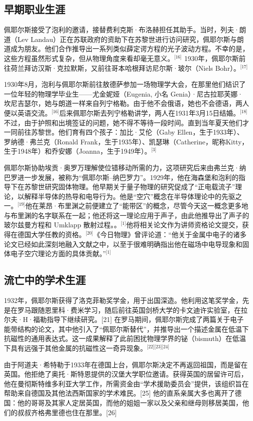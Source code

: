 \subsection{早期职业生涯}
佩耶尔斯接受了泡利的邀请，接替费利克斯·布洛赫担任其助手。当时，列夫·朗道（Lev Landau）正在苏联政府的资助下在苏黎世进行访问研究，佩耶尔斯与朗道成为朋友。他们合作推导出一系列类似薛定谔方程的光子波动方程。不幸的是，这些方程虽然形式复杂，但从物理角度来看却毫无意义。\(^\text{[16]}\)
1930年，佩耶尔斯前往荷兰拜访汉斯·克拉默斯，又前往哥本哈根拜访尼尔斯·玻尔（Niels Bohr）。\(^\text{[17]}\)

1930年8月，泡利与佩耶尔斯前往敖德萨参加一场物理学大会，在那里他们结识了一位年轻的物理学毕业生——尤金妮娅（Eugenia, 小名 Genia）·尼古拉耶芙娜·坎尼吉瑟尔，她与朗道一样来自列宁格勒。由于他不会俄语，她也不会德语，两人便以英语交流。\(^\text{[16]}\)后来佩耶尔斯去列宁格勒讲学，两人在1931年3月15日结婚。\(^\text{[18]}\)不过，由于护照和出境签证的问题，她不得不等待一段时间。直到当年夏天他们才一同前往苏黎世。他们育有四个孩子：加比·艾伦（Gaby Ellen，生于1933年）、罗纳德·弗兰克（Ronald Frank，生于1935年）、凯瑟琳（Catherine，昵称Kitty，生于1948年）和乔安娜（Joanna，生于1949年）。\(^\text{[3]}\)

佩耶尔斯协助埃贡·奥罗万理解使位错移动所需的力，这项研究后来由弗兰克·纳巴罗进一步发展，被称为“佩耶尔斯–纳巴罗力”。1929年，他在海森堡和泡利的指导下在苏黎世研究固体物理。他早期关于量子物理的研究促成了“正电载流子”理论，以解释半导体的热导和电导行为。他是“空穴”概念在半导体理论中的先驱之一。\(^\text{[19]}\)他在莱昂·布里渊之前便建立了“能带区”的概念，尽管今天这一概念更多地与布里渊的名字联系在一起；他还将这一理论应用于声子，由此他推导出了声子的玻尔兹曼方程和 Umklapp 散射过程。。\(^\text{[1]}\)他将相关论文作为讲师资格论文提交，获得在德国大学任教的资格。\(^\text{[20]}\)《今日物理》曾评论道：“他关于金属中电子的诸多论文已经如此深刻地融入文献之中，以至于很难明确指出他在磁场中电导现象和固体电子空穴理论方面的具体贡献。”\(^\text{[1]}\)
\subsection{流亡中的学术生涯}
1932年，佩耶尔斯获得了洛克菲勒奖学金，用于出国深造。他利用这笔奖学金，先是在罗马跟随恩里科·费米学习，随后前往英国剑桥大学的卡文迪许实验室，在拉尔夫·H·福勒指导下继续研究。[21] 在罗马期间，佩耶尔斯完成了两篇关于电子能带结构的论文，其中他引入了“佩耶尔斯替代”，并推导出一个描述金属在低温下抗磁性的通用表达式。这一成果解释了此前困扰物理学界的铋（bismuth）在低温下具有远强于其他金属的抗磁性这一奇异现象。\(^\text{[22][23][24]}\)

由于阿道夫·希特勒于1933年在德国上台，佩耶尔斯决定不再返回祖国，而是留在英国。他拒绝了奥托·斯特恩提供的汉堡大学职位邀请。获得英国的居留许可后，他在曼彻斯特维多利亚大学工作，所需资金由“学术援助委员会”提供，该组织旨在帮助来自德国及其他法西斯国家的学术难民。[25] 他的直系亲属大多也离开了德国：他的哥哥及其家人定居英国，而他的姐姐一家以及父亲和继母则移居美国，他们的叔叔齐格弗里德也住在那里。[26]

